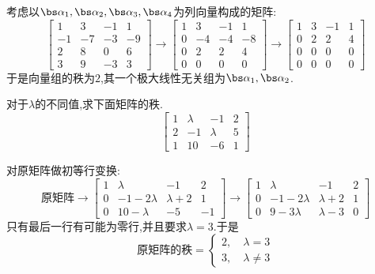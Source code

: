 \documentclass{ctexart}
\begin{document}
\begin{solution}
    考虑以$\bs\alpha_1,\bs\alpha_2,\bs\alpha_3,\bs\alpha_4$为列向量构成的矩阵:
    \[\begin{bmatrix}
        1&3&-1&1\\
        -1&-7&-3&-9\\
        2&8&0&6\\
        3&9&-3&3
    \end{bmatrix}\longrightarrow\begin{bmatrix}
        1&3&-1&1\\
        0&-4&-4&-8\\
        0&2&2&4\\
        0&0&0&0
    \end{bmatrix}\longrightarrow\begin{bmatrix}
        1&3&-1&1\\
        0&2&2&4\\
        0&0&0&0\\
        0&0&0&0
    \end{bmatrix}\]
    于是向量组的秩为$2$,其一个极大线性无关组为$\bs\alpha_1,\bs\alpha_2$.
\end{solution}
\begin{homework}[3]
    对于$\lambda$的不同值,求下面矩阵的秩.
    \[\begin{bmatrix}
        1&\lambda&-1&2\\
        2&-1&\lambda&5\\
        1&10&-6&1
    \end{bmatrix}\]
\end{homework}
\begin{solution}
    对原矩阵做初等行变换:
    \[\text{原矩阵}\longrightarrow\begin{bmatrix}
        1&\lambda&-1&2\\
        0&-1-2\lambda&\lambda+2&1\\
        0&10-\lambda&-5&-1
    \end{bmatrix}\longrightarrow\begin{bmatrix}
        1&\lambda&-1&2\\
        0&-1-2\lambda&\lambda+2&1\\
        0&9-3\lambda&\lambda-3&0
    \end{bmatrix}\]
    只有最后一行有可能为零行,并且要求$\lambda=3$.于是
    \[\text{原矩阵的秩}=\left\{\begin{array}{l}
       2,\quad\lambda=3\\
       3,\quad\lambda\neq3
    \end{array}\right.\]
\end{solution}
\end{document}
